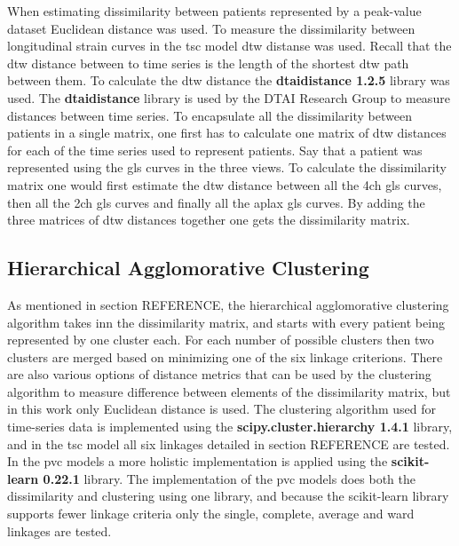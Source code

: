 When estimating dissimilarity between patients represented by a peak-value dataset Euclidean distance was used. To measure the dissimilarity between longitudinal strain curves in the \acrshort{tsc} model \acrshort{dtw} distanse was used. Recall that the \acrshort{dtw} distance between to time series is the length of the shortest \acrshort{dtw} path between them. To calculate the \acrshort{dtw} distance the \textbf{dtaidistance 1.2.5} library was used. The \textbf{dtaidistance} library is used by the DTAI Research Group to measure distances between time series. To encapsulate all the dissimilarity between patients in a single matrix, one first has to calculate one matrix of \acrshort{dtw} distances for each of the time series used to represent patients. Say that a patient was represented using the \acrshort{gls} curves in the three views. To calculate the dissimilarity matrix one would first estimate the \acrshort{dtw} distance between all the \acrshort{4ch} \acrshort{gls} curves, then all the \acrshort{2ch} \acrshort{gls} curves and finally all the \acrshort{aplax} \acrshort{gls} curves. By adding the three matrices of \acrshort{dtw} distances together one gets the dissimilarity matrix. \bigskip

\subsection{Hierarchical Agglomorative Clustering}

As mentioned in section REFERENCE, the hierarchical agglomorative clustering algorithm takes inn the dissimilarity matrix, and starts with every patient being represented by one cluster each. For each number of possible clusters then two clusters are merged based on minimizing one of the six linkage criterions. There are also various options of distance metrics that can be used by the clustering algorithm to measure difference between elements of the dissimilarity matrix, but in this work only Euclidean distance is used. The clustering algorithm used for time-series data is implemented using the \textbf{scipy.cluster.hierarchy 1.4.1} library, and in the \acrshort{tsc} model all six linkages detailed in section REFERENCE are tested. In the \acrshort{pvc} models a more holistic implementation is applied using the \textbf{scikit-learn 0.22.1} library. The implementation of the \acrshort{pvc} models does both the dissimilarity and clustering using one library, and because the scikit-learn library supports fewer linkage criteria only the single, complete, average and ward linkages are tested. 

